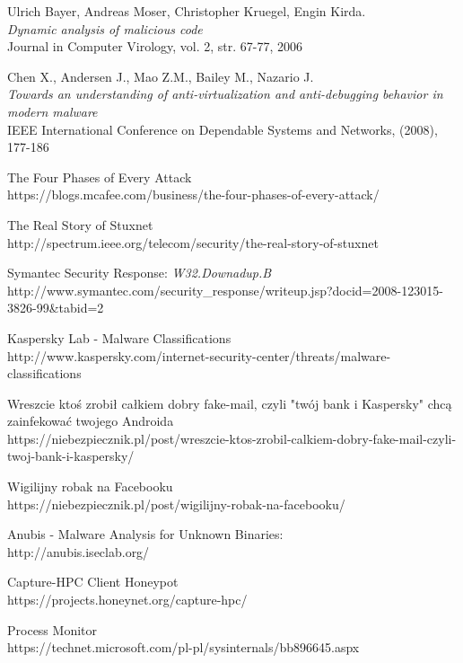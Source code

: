 \documentclass[a4paper,12pt,oneside]{article}
\begin{document}
\begin{thebibliography}{99}
	 Ulrich Bayer, Andreas Moser, Christopher 
	Kruegel, Engin Kirda. \\
		{\it Dynamic analysis of malicious code} \\
		 Journal in Computer Virology, vol. 2, str. 67-77, 2006 
		 
	 Chen X., Andersen J., Mao Z.M., Bailey M., 
	Nazario J. \\
		{\it Towards an understanding of anti-virtualization 
			and anti-debugging behavior in modern malware} \\
		IEEE International Conference on Dependable Systems and 
		Networks, (2008), 177-186 

	 The Four Phases of Every Attack \\
		https://blogs.mcafee.com/business/the-four-phases-of-every-attack/
	
	 The Real Story of Stuxnet \\
		http://spectrum.ieee.org/telecom/security/the-real-story-of-stuxnet
	
	 Symantec Security Response: \textit{W32.Downadup.B} 
		http://www.symantec.com/security\_response/writeup.jsp?docid=2008-123015-3826-99\&tabid=2
		
	 Kaspersky Lab - Malware Classifications \\
		http://www.kaspersky.com/internet-security-center/threats/malware-classifications
	
	 Wreszcie ktoś zrobił całkiem dobry fake-mail, czyli "twój bank i Kaspersky" chcą zainfekować twojego Androida \\
		https://niebezpiecznik.pl/post/wreszcie-ktos-zrobil-calkiem-dobry-fake-mail-czyli-twoj-bank-i-kaspersky/
	
	 Wigilijny robak na Facebooku \\ 		
		https://niebezpiecznik.pl/post/wigilijny-robak-na-facebooku/
	
	 Anubis - Malware Analysis for Unknown Binaries: \\
		http://anubis.iseclab.org/
		
	 Capture-HPC Client Honeypot \\
		https://projects.honeynet.org/capture-hpc/
		
	 Process Monitor \\
		https://technet.microsoft.com/pl-pl/sysinternals/bb896645.aspx
		

\end{thebibliography}
\end{document}
